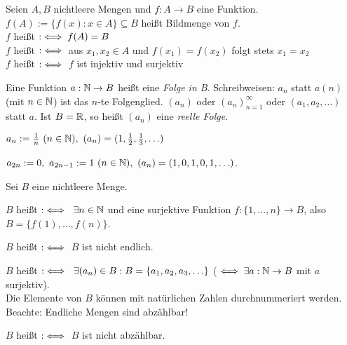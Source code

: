 \documentclass[a4paper,twoside,DIV15,BCOR12mm]{scrbook}
\begin{document}
\begin{definition}
Seien $A,B$ nichtleere Mengen und $f: A \rightarrow B$ eine Funktion. $f(A) := \{ f(x): x \in A \} \subseteq B$ heißt Bildmenge von $f$. \\
$f$ heißt  $:\iff f(A)=B$ \\
$f$ heißt  $:\iff $ aus $x_1,x_2 \in A$ und $f(x_1) = f(x_2)$ folgt stets $x_1=x_2$ \\
$f$ heißt  $:\iff$ $f$ ist injektiv und surjektiv
\end{definition}

\begin{definition}
Eine Funktion $a:\mathbb{N} \rightarrow B$ heißt eine \textit{Folge in B}. Schreibweisen: $a_n$ statt $a(n)$ (mit $n \in \mathbb{N}$) ist das $n$-te Folgenglied. $(a_n)$ oder $(a_n)_{n=1}^\infty$ oder $(a_1, a_2,\ldots)$ statt $a$. Ist $B=\mathbb{R}$, so heißt $(a_n)$ eine \textit{reelle Folge}.
\end{definition}

\begin{beispiele}
\item $a_n := \frac{1}{n} \ (n \in \mathbb{N}), \ (a_n) = (1,\frac{1}{2},\frac{1}{3},\ldots)$ \\
\item $a_{2n} := 0,\  a_{2n-1} := 1 \ (n \in \mathbb{N}), \ (a_n) = (1,0,1,0,1,\ldots)$.
\end{beispiele}

\begin{definition}
Sei $B$ eine nichtleere Menge.
\begin{liste}
\item $B$ heißt  $:\iff \ \exists n \in \mathbb{N}$ und eine surjektive Funktion $f:\{1,\ldots,n\} \rightarrow B$, also $B=\{f(1),\ldots,f(n)\}$.
\item $B$ heißt  $:\iff$ $B$ ist nicht endlich.
\item $B$ heißt  $:\iff \ \exists  (a_n) \in B: B=\{a_1,a_2,a_3,\ldots\}$ ($\iff \exists a: \mathbb{N} \rightarrow B$  mit $a$ surjektiv).\\
\glqq Die Elemente von $B$ können mit natürlichen Zahlen durchnummeriert werden.\grqq\\
Beachte: Endliche Mengen sind abzählbar!
\item $B$ heißt  $:\iff$ $B$ ist nicht abzählbar.
\end{liste}
\end{definition}
\end{document}
